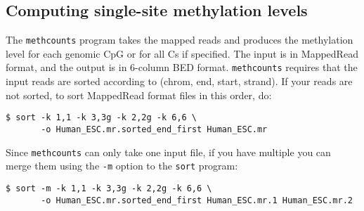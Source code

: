 \documentclass[10pt]{article}
\newcommand{\prog}[1]{\texttt{#1}}
\newcommand{\op}[1]{\texttt{#1}}
\begin{document}



\subsection{Computing single-site methylation levels}
\label{sec:estim-methyl-freq}

The \prog{methcounts} program takes the mapped reads and produces the
methylation level for each genomic CpG or for all Cs if specified.
The input is in MappedRead format, and the output is in 6-column BED
format. \prog{methcounts} requires that the input reads are sorted
according to (chrom, end, start, strand). If your reads are not
sorted, to sort MappedRead format files in this order, do:
\begin{verbatim}
$ sort -k 1,1 -k 3,3g -k 2,2g -k 6,6 \
       -o Human_ESC.mr.sorted_end_first Human_ESC.mr
\end{verbatim}
Since \prog{methcounts} can only take one input file, if you have
multiple you can merge them using the \op{-m} option to the
\prog{sort} program:
\begin{verbatim}
$ sort -m -k 1,1 -k 3,3g -k 2,2g -k 6,6 \
       -o Human_ESC.mr.sorted_end_first Human_ESC.mr.1 Human_ESC.mr.2
\end{verbatim}
\end{document}

